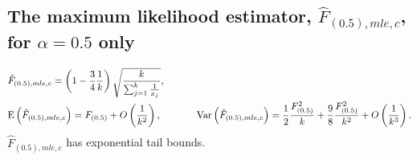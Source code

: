 \documentclass[oneside,10pt]{article}
\begin{document}
\subsection{The maximum likelihood estimator, $\hat{F}_{(0.5),mle,c}$, for $\alpha = 0.5$ only}\begin{align}\notag
&\hat{F}_{(0.5),mle,c}  =  \left(1-\frac{3}{4}\frac{1}{k}\right)\sqrt{\frac{k}{\sum_{j=1}^k\frac{1}{x_j}}},\\\notag
&\text{E}\left(\hat{F}_{(0.5),mle,c}\right) = F_{(0.5)} + O\left(\frac{1}{k^2}\right),\hspace{0.5in}
\text{Var}\left(\hat{F}_{(0.5),mle,c}\right) = \frac{1}{2}\frac{F_{(0.5)}^2}{k} + \frac{9}{8}\frac{F_{(0.5)}^2}{k^2} +
O\left(\frac{1}{k^3}\right).
\end{align}
$\hat{F}_{(0.5),mle,c}$ has exponential tail bounds.
\end{document}
